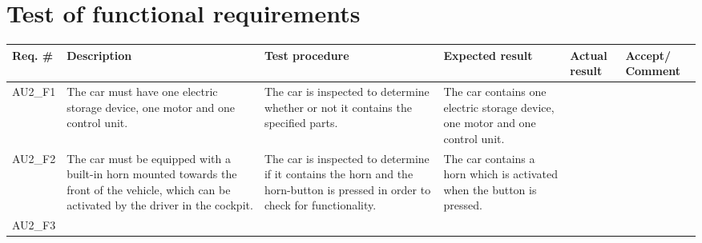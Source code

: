 \section{Test of functional requirements}

\begin{longtable}{|p{1.6 cm}|p{2.9 cm}|p{2.9 cm}|p{1.9 cm}|p{1.8 cm}|p{1.8 cm}|}
	\hline
	\textbf{Req. \#} & \textbf{Description} & \textbf{Test procedure} & 
	\textbf{Expected result} & \textbf{Actual result} & \textbf{Accept/ Comment} \\ \hline
	\endhead
	AU2\_F1 
	& The car must have one electric storage device, one motor and one control unit.
	& The car is inspected to determine whether or not it contains the specified parts.
	& The car contains one electric storage device, one motor and one control unit.
	& 
	& \\ \hline
	AU2\_F2 
	& The car must be equipped with a built-in horn mounted towards the front of the vehicle, which can be activated by the driver in the cockpit.
	& The car is inspected to determine if it contains the horn and the horn-button is pressed in order to check for functionality.
	& The car contains a horn which is activated when the button is pressed.
	& 
	& \\ \hline
	AU2\_F3 
	

\end{longtable}
